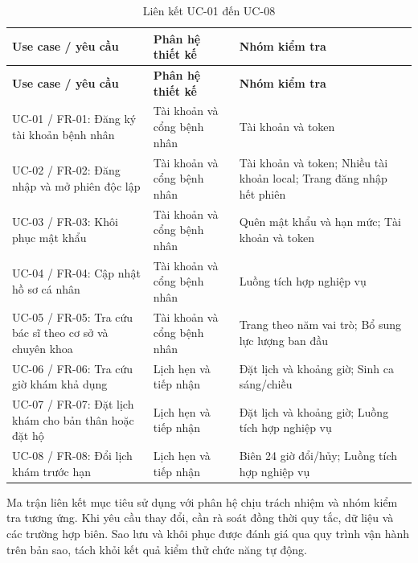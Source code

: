 {\small\setlength{\tabcolsep}{3pt}\renewcommand{\arraystretch}{1.12}
\begin{longtable}{@{}L{\textwidth-4.8pt\relax} L{\textwidth-3.24pt\relax} L{\textwidth-3.96pt\relax}@{}}
\caption{Liên kết UC-01 đến UC-08}\\
\toprule
\textbf{Use case /\allowbreak{} yêu cầu} & \textbf{Phân hệ thiết kế} & \textbf{Nhóm kiểm tra}\\\midrule
\endfirsthead
\toprule
\textbf{Use case /\allowbreak{} yêu cầu} & \textbf{Phân hệ thiết kế} & \textbf{Nhóm kiểm tra}\\\midrule
\endhead
\bottomrule\endlastfoot
UC-01 /\allowbreak{} FR-01:\allowbreak{} Đăng ký tài khoản bệnh nhân & Tài khoản và cổng bệnh nhân & Tài khoản và token\\[3pt]
UC-02 /\allowbreak{} FR-02:\allowbreak{} Đăng nhập và mở phiên độc lập & Tài khoản và cổng bệnh nhân & Tài khoản và token; Nhiều tài khoản local; Trang đăng nhập hết phiên\\[3pt]
UC-03 /\allowbreak{} FR-03:\allowbreak{} Khôi phục mật khẩu & Tài khoản và cổng bệnh nhân & Quên mật khẩu và hạn mức; Tài khoản và token\\[3pt]
UC-04 /\allowbreak{} FR-04:\allowbreak{} Cập nhật hồ sơ cá nhân & Tài khoản và cổng bệnh nhân & Luồng tích hợp nghiệp vụ\\[3pt]
UC-05 /\allowbreak{} FR-05:\allowbreak{} Tra cứu bác sĩ theo cơ sở và chuyên khoa & Tài khoản và cổng bệnh nhân & Trang theo năm vai trò; Bổ sung lực lượng ban đầu\\[3pt]
UC-06 /\allowbreak{} FR-06:\allowbreak{} Tra cứu giờ khám khả dụng & Lịch hẹn và tiếp nhận & Đặt lịch và khoảng giờ; Sinh ca sáng/\allowbreak{}chiều\\[3pt]
UC-07 /\allowbreak{} FR-07:\allowbreak{} Đặt lịch khám cho bản thân hoặc đặt hộ & Lịch hẹn và tiếp nhận & Đặt lịch và khoảng giờ; Luồng tích hợp nghiệp vụ\\[3pt]
UC-08 /\allowbreak{} FR-08:\allowbreak{} Đổi lịch khám trước hạn & Lịch hẹn và tiếp nhận & Biên 24 giờ đổi/\allowbreak{}hủy; Luồng tích hợp nghiệp vụ\\[3pt]
\end{longtable}}
Ma trận liên kết mục tiêu sử dụng với phân hệ chịu trách nhiệm và nhóm kiểm tra tương ứng.\allowbreak{} Khi yêu cầu thay đổi, cần rà soát đồng thời quy tắc, dữ liệu và các trường hợp biên.\allowbreak{} Sao lưu và khôi phục được đánh giá qua quy trình vận hành trên bản sao, tách khỏi kết quả kiểm thử chức năng tự động.\allowbreak{}

